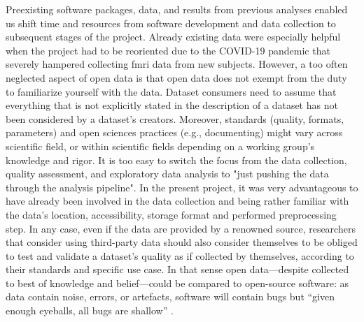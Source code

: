 %
Preexisting software packages, data, and results from previous analyses enabled
us shift time and resources from software development and data collection to
subsequent stages of the project.
%
Already existing data were especially helpful when the project had to be
reoriented due to the COVID-19 pandemic that severely hampered collecting
\ac{fmri} data from new subjects.
%
However, a too often neglected aspect of open data is that open data does not
exempt from the duty to familiarize yourself with the data.
Dataset consumers need to assume that everything that is not explicitly stated
in the description of a dataset has not been considered by a dataset's creators.
%
Moreover, standards (quality, formats, parameters) and open sciences practices
(e.g., documenting) might vary across scientific field, or within scientific
fields depending on a working group's knowledge and rigor.
%
It is too easy to switch the focus from the data collection, quality assessment,
and exploratory data analysis to "just pushing the data through the analysis
pipeline".
%
In the present project, it was very advantageous to have already been involved
in the data collection and being rather familiar with the data's location,
accessibility, storage format and performed preprocessing step.
In any case, even if the data are provided by a renowned source, researchers
that consider using third-party data should also consider themselves to be
obliged to test and validate a dataset's quality as if collected by themselves,
according to their standards and specific use case.
%
In that sense open data---despite collected to best of knowledge and
belief---could be compared to open-source software:
%
as data contain noise, errors, or artefacts, software will contain bugs but
``given enough eyeballs, all bugs are shallow'' \citep[][p.
30]{raymond1999cathedral}.




